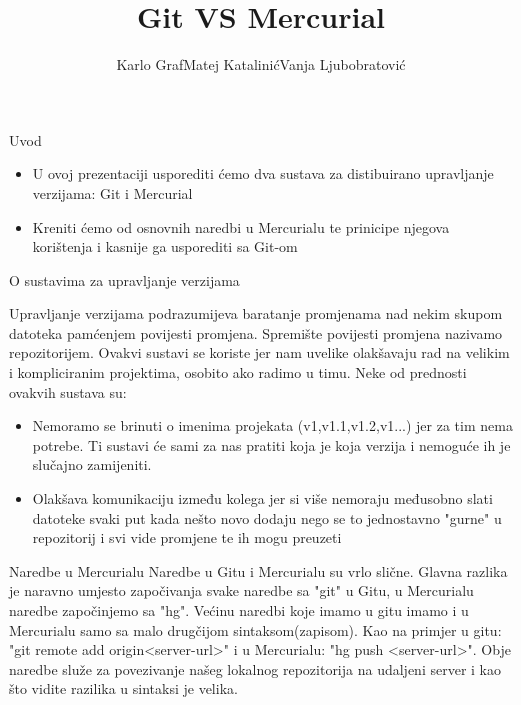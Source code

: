 \documentclass{beamer}
\title[]{Git VS Mercurial}
\author{Karlo Graf\newline Matej Katalinić\newline Vanja Ljubobratović}
\institute{Tehnički Fakultet, Sveučilište u Rijeci}
\begin{document}
\begin{frame}
  \titlepage
\end{frame}


\begin{frame}{Uvod}

\begin{itemize}
  \item U ovoj prezentaciji usporediti ćemo dva sustava za distibuirano upravljanje verzijama: Git i Mercurial
  \item Kreniti ćemo od osnovnih naredbi u Mercurialu te prinicipe njegova korištenja i kasnije ga usporediti sa Git-om
\end{itemize}

\vskip 1cm


\end{frame}

\begin{frame}{O sustavima za upravljanje verzijama}

Upravljanje verzijama podrazumijeva baratanje promjenama nad nekim skupom datoteka pamćenjem povijesti promjena. Spremište povijesti promjena nazivamo repozitorijem. Ovakvi sustavi se koriste jer nam uvelike olakšavaju rad na velikim i kompliciranim projektima, osobito ako radimo u timu. Neke od prednosti ovakvih sustava su:
\begin{itemize}
  \item Nemoramo se brinuti o imenima projekata (v1,v1.1,v1.2,v1...) jer za tim nema potrebe. Ti sustavi će sami za nas pratiti koja je koja verzija i nemoguće ih je slučajno zamijeniti.
  \item Olakšava komunikaciju između kolega jer si više nemoraju međusobno slati datoteke svaki put kada nešto novo dodaju nego se to jednostavno "gurne" u repozitorij i svi vide promjene te ih mogu preuzeti
\end{itemize}
\end{frame}
\begin{frame}{Naredbe u Mercurialu}
Naredbe u Gitu i Mercurialu su vrlo slične. Glavna razlika je naravno umjesto započivanja svake naredbe sa "git" u Gitu, u Mercurialu naredbe započinjemo sa "hg". Većinu naredbi koje imamo u gitu imamo i u Mercurialu samo sa malo drugčijom sintaksom(zapisom). Kao na primjer u gitu: "git remote add origin<server-url>" i u Mercurialu: "hg push <server-url>". Obje naredbe služe za povezivanje našeg lokalnog repozitorija na udaljeni server i kao što vidite razilika u sintaksi je velika. 

\end{frame}
\end{document}
